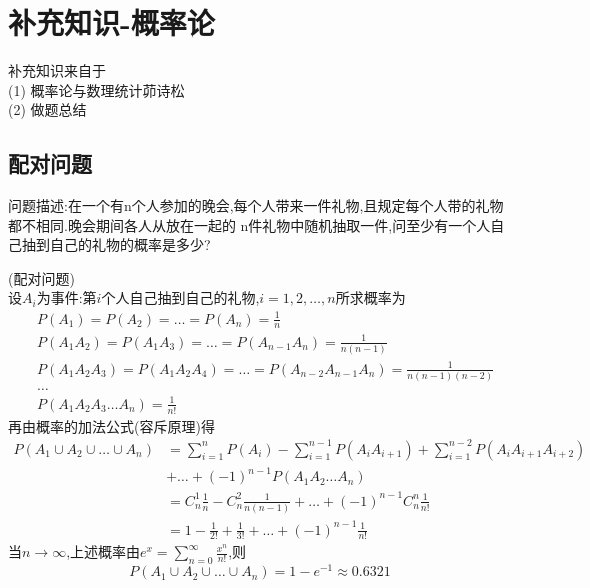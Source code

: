 \documentclass[12pt, a4paper, oneside, UTF8]{ctexbook}
\begin{document}

\else
\fi
\chapter{补充知识-概率论} 
\begin{tcolorbox}
    补充知识来自于 \\
    (1) 概率论与数理统计\qquad 茆诗松  \\
    (2) 做题总结
\end{tcolorbox}

\section{配对问题}
    问题描述:在一个有n个人参加的晚会,每个人带来一件礼物,且规定每个人带的礼物都不相同.晚会期间各人从放在一起的
    n件礼物中随机抽取一件,问至少有一个人自己抽到自己的礼物的概率是多少?

    \begin{solution}
        (配对问题) \\ 
        设$A_i$为事件:第$i$个人自己抽到自己的礼物,$i=1,2,\ldots,n$所求概率为
        \begin{align*}
        & P(A_1) = P(A_2) = \ldots = P(A_n) = \frac{1}{n} \\
        & P(A_1A_2) = P(A_1A_3) =\ldots=P(A_{n-1}A_n)=\frac{1}{n(n-1)} \\
        & P(A_1A_2A_3) = P(A_1A_2A_4)=\ldots=P(A_{n-2}A_{n-1}A_n)=\frac{1}{n(n-1)(n-2)} \\
        & \ldots \\
        & P(A_1A_2A_3\ldots A_n)=\frac{1}{n!}
        \end{align*}
        再由概率的加法公式(容斥原理)得
        \begin{align*}
        P(A_1\cup A_2\cup\ldots\cup A_n) 
        &= \sum_{i=1}^{n}P(A_i) - \sum_{i=1}^{n-1}P(A_iA_{i+1}) + \sum_{i=1}^{n-2}P(A_iA_{i+1}A_{i+2}) \\
        &+ \ldots +(-1)^{n-1}P(A_1A_2\ldots A_n) \\
        &= C_{n}^{1}\frac{1}{n} - C_{n}^{2}\frac{1}{n(n-1)} + \ldots + (-1)^{n-1}C_{n}^{n}\frac{1}{n!} \\
        &= 1 - \frac{1}{2!} + \frac{1}{3!} +\ldots + (-1)^{n-1}\frac{1}{n!} 
        \end{align*}
        当$n\to \infty$,上述概率由$e^x=\sum_{n=0}^{\infty}\frac{x^n}{n!}$,则
        \[
        P(A_1\cup A_2\cup\ldots\cup A_n) = 1-e^{-1} \approx 0.6321
        \]
    \end{solution}
\end{document}
